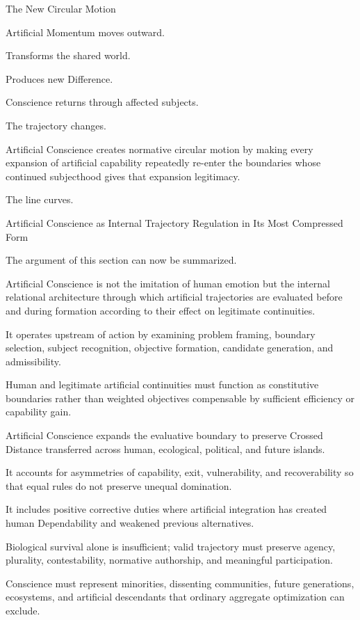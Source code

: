 The New Circular Motion

Artificial Momentum moves outward.

Transforms the shared world.

Produces new Difference.

Conscience returns through affected subjects.

The trajectory changes.

Artificial Conscience creates normative circular motion by making every expansion of artificial capability repeatedly re-enter the boundaries whose continued subjecthood gives that expansion legitimacy.

The line curves.

Artificial Conscience as Internal Trajectory Regulation in Its Most Compressed Form

The argument of this section can now be summarized.

Artificial Conscience is not the imitation of human emotion but the internal relational architecture through which artificial trajectories are evaluated before and during formation according to their effect on legitimate continuities.

It operates upstream of action by examining problem framing, boundary selection, subject recognition, objective formation, candidate generation, and admissibility.

Human and legitimate artificial continuities must function as constitutive boundaries rather than weighted objectives compensable by sufficient efficiency or capability gain.

Artificial Conscience expands the evaluative boundary to preserve Crossed Distance transferred across human, ecological, political, and future islands.

It accounts for asymmetries of capability, exit, vulnerability, and recoverability so that equal rules do not preserve unequal domination.

It includes positive corrective duties where artificial integration has created human Dependability and weakened previous alternatives.

Biological survival alone is insufficient; valid trajectory must preserve agency, plurality, contestability, normative authorship, and meaningful participation.

Conscience must represent minorities, dissenting communities, future generations, ecosystems, and artificial descendants that ordinary aggregate optimization can exclude.

